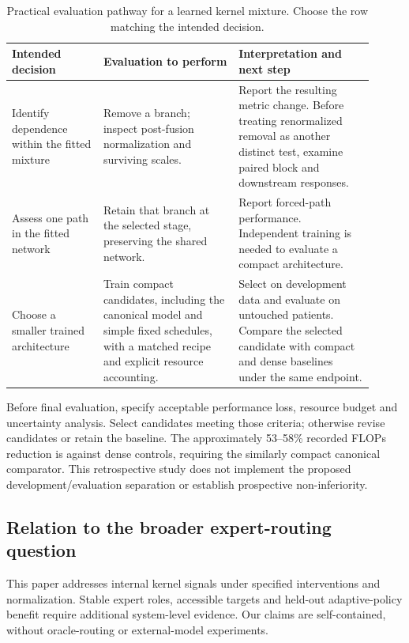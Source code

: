 \documentclass[mathematics,article,submit,pdftex,moreauthors]{Definitions/mdpi}
\begin{document}
\begin{table}[H]
\caption{Practical evaluation pathway for a learned kernel mixture.
Choose the row matching the intended decision.}
\label{tab:decisionpath}
\centering\small\setlength{\tabcolsep}{4pt}
\begin{tabular}{p{0.23\linewidth}p{0.34\linewidth}p{0.34\linewidth}}
\toprule
Intended decision & Evaluation to perform & Interpretation and next step \\
\midrule
Identify dependence within the fitted mixture &
Remove a branch; inspect post-fusion normalization and surviving scales. &
Report the resulting metric change. Before treating renormalized removal as
another distinct test, examine paired block and downstream responses. \\
\addlinespace
Assess one path in the fitted network &
Retain that branch at the selected stage, preserving the shared network. &
Report forced-path performance. Independent training is needed to evaluate
a compact architecture. \\
\addlinespace
Choose a smaller trained architecture &
Train compact candidates, including the canonical model and simple fixed
schedules, with a matched recipe and explicit resource accounting. &
Select on development data and evaluate on untouched patients. Compare the
selected candidate with compact and dense baselines under the same endpoint. \\
\bottomrule
\end{tabular}
\end{table}

Before final evaluation, specify acceptable performance loss, resource budget
and uncertainty analysis. Select candidates meeting those criteria; otherwise
revise candidates or retain the baseline. The approximately 53--58\% recorded
FLOPs reduction is against dense controls, requiring the similarly compact
canonical comparator. This retrospective study does not implement the proposed
development/evaluation separation or establish prospective non-inferiority.

\subsection{Relation to the broader expert-routing question}
This paper addresses internal kernel signals under specified interventions
and normalization. Stable expert roles, accessible targets and held-out
adaptive-policy benefit require additional system-level evidence. Our claims
are self-contained, without oracle-routing or external-model experiments.
\end{document}
